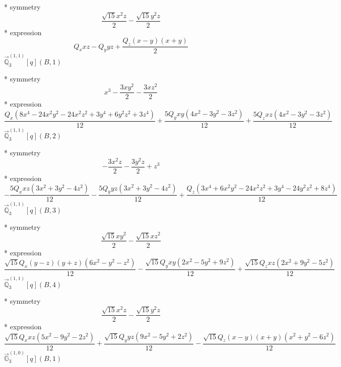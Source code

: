 \documentclass[fleqn,8pt]{jsarticle}
\begin{document}
\noindent\quad ** symmetry
\begin{dmath*}
\frac{\sqrt{15} x^{2} z}{2} - \frac{\sqrt{15} y^{2} z}{2}
\end{dmath*}
\noindent\quad ** expression
\begin{dmath*}
Q_{x} x z - Q_{y} y z + \frac{Q_{z} \left(x - y\right) \left(x + y\right)}{2}
\end{dmath*}
\noindent\quad $\vec{\mathbb{Q}}_{3}^{(1,1)}[q](B,1)$

\noindent\quad ** symmetry
\begin{dmath*}
x^{3} - \frac{3 x y^{2}}{2} - \frac{3 x z^{2}}{2}
\end{dmath*}
\noindent\quad ** expression
\begin{dmath*}
\frac{Q_{x} \left(8 x^{4} - 24 x^{2} y^{2} - 24 x^{2} z^{2} + 3 y^{4} + 6 y^{2} z^{2} + 3 z^{4}\right)}{12} + \frac{5 Q_{y} x y \left(4 x^{2} - 3 y^{2} - 3 z^{2}\right)}{12} + \frac{5 Q_{z} x z \left(4 x^{2} - 3 y^{2} - 3 z^{2}\right)}{12}
\end{dmath*}
\noindent\quad $\vec{\mathbb{Q}}_{3}^{(1,1)}[q](B,2)$

\noindent\quad ** symmetry
\begin{dmath*}
- \frac{3 x^{2} z}{2} - \frac{3 y^{2} z}{2} + z^{3}
\end{dmath*}
\noindent\quad ** expression
\begin{dmath*}
- \frac{5 Q_{x} x z \left(3 x^{2} + 3 y^{2} - 4 z^{2}\right)}{12} - \frac{5 Q_{y} y z \left(3 x^{2} + 3 y^{2} - 4 z^{2}\right)}{12} + \frac{Q_{z} \left(3 x^{4} + 6 x^{2} y^{2} - 24 x^{2} z^{2} + 3 y^{4} - 24 y^{2} z^{2} + 8 z^{4}\right)}{12}
\end{dmath*}
\noindent\quad $\vec{\mathbb{Q}}_{3}^{(1,1)}[q](B,3)$

\noindent\quad ** symmetry
\begin{dmath*}
\frac{\sqrt{15} x y^{2}}{2} - \frac{\sqrt{15} x z^{2}}{2}
\end{dmath*}
\noindent\quad ** expression
\begin{dmath*}
\frac{\sqrt{15} Q_{x} \left(y - z\right) \left(y + z\right) \left(6 x^{2} - y^{2} - z^{2}\right)}{12} - \frac{\sqrt{15} Q_{y} x y \left(2 x^{2} - 5 y^{2} + 9 z^{2}\right)}{12} + \frac{\sqrt{15} Q_{z} x z \left(2 x^{2} + 9 y^{2} - 5 z^{2}\right)}{12}
\end{dmath*}
\noindent\quad $\vec{\mathbb{Q}}_{3}^{(1,1)}[q](B,4)$

\noindent\quad ** symmetry
\begin{dmath*}
\frac{\sqrt{15} x^{2} z}{2} - \frac{\sqrt{15} y^{2} z}{2}
\end{dmath*}
\noindent\quad ** expression
\begin{dmath*}
\frac{\sqrt{15} Q_{x} x z \left(5 x^{2} - 9 y^{2} - 2 z^{2}\right)}{12} + \frac{\sqrt{15} Q_{y} y z \left(9 x^{2} - 5 y^{2} + 2 z^{2}\right)}{12} - \frac{\sqrt{15} Q_{z} \left(x - y\right) \left(x + y\right) \left(x^{2} + y^{2} - 6 z^{2}\right)}{12}
\end{dmath*}
\noindent\quad $\vec{\mathbb{G}}_{3}^{(1,0)}[q](B,1)$
\end{document}
